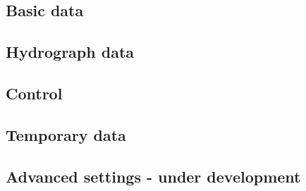     \subsection{Basic data}
    \subsection{Hydrograph data}
    \subsection{Control}
    \subsection{Temporary data}
    \subsection{Advanced settings - under development}
